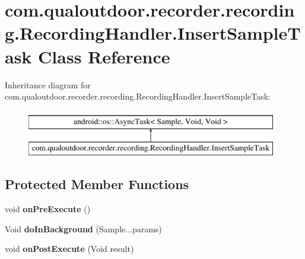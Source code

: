 \hypertarget{classcom_1_1qualoutdoor_1_1recorder_1_1recording_1_1RecordingHandler_1_1InsertSampleTask}{\section{com.\-qualoutdoor.\-recorder.\-recording.\-Recording\-Handler.\-Insert\-Sample\-Task Class Reference}
\label{classcom_1_1qualoutdoor_1_1recorder_1_1recording_1_1RecordingHandler_1_1InsertSampleTask}
}
Inheritance diagram for com.\-qualoutdoor.\-recorder.\-recording.\-Recording\-Handler.\-Insert\-Sample\-Task\-:\begin{figure}[H]
\begin{center}
\leavevmode
\includegraphics[height=2.000000cm]{classcom_1_1qualoutdoor_1_1recorder_1_1recording_1_1RecordingHandler_1_1InsertSampleTask}
\end{center}
\end{figure}
\subsection*{Protected Member Functions}
\begin{DoxyCompactItemize}
\item 
\hypertarget{classcom_1_1qualoutdoor_1_1recorder_1_1recording_1_1RecordingHandler_1_1InsertSampleTask_a047ef2cc1d908a53862133e669546417}{void {\bfseries on\-Pre\-Execute} ()}\label{classcom_1_1qualoutdoor_1_1recorder_1_1recording_1_1RecordingHandler_1_1InsertSampleTask_a047ef2cc1d908a53862133e669546417}

\item 
\hypertarget{classcom_1_1qualoutdoor_1_1recorder_1_1recording_1_1RecordingHandler_1_1InsertSampleTask_ac10777d40feea12c7a6cf28ae8febf94}{Void {\bfseries do\-In\-Background} (Sample...\-params)}\label{classcom_1_1qualoutdoor_1_1recorder_1_1recording_1_1RecordingHandler_1_1InsertSampleTask_ac10777d40feea12c7a6cf28ae8febf94}

\item 
\hypertarget{classcom_1_1qualoutdoor_1_1recorder_1_1recording_1_1RecordingHandler_1_1InsertSampleTask_a555f8d6443c80d2d2c3d6f0c43970fdf}{void {\bfseries on\-Post\-Execute} (Void result)}\label{classcom_1_1qualoutdoor_1_1recorder_1_1recording_1_1RecordingHandler_1_1InsertSampleTask_a555f8d6443c80d2d2c3d6f0c43970fdf}

\end{DoxyCompactItemize}
